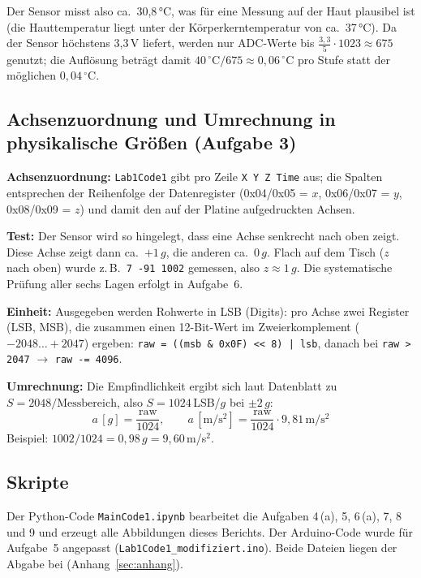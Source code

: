 \documentclass[a4paper,oneside,10pt]{article}
\begin{document}
Der Sensor misst also ca.\ 30{,}8\,°C, was für eine Messung auf der Haut plausibel
ist (die Hauttemperatur liegt unter der Körperkerntemperatur von ca.\ 37\,°C).
Da der Sensor höchstens 3{,}3\,V liefert, werden nur ADC-Werte bis
$\frac{3{,}3}{5}\cdot 1023 \approx 675$ genutzt; die Auflösung beträgt damit
$40\,^\circ\mathrm{C}/675 \approx 0{,}06\,^\circ$C pro Stufe statt der möglichen
$0{,}04\,^\circ$C.

\subsection{Achsenzuordnung und Umrechnung in physikalische Größen (Aufgabe 3)}

\textbf{Achsenzuordnung:} \texttt{Lab1Code1} gibt pro Zeile \texttt{X Y Z Time}
aus; die Spalten entsprechen der Reihenfolge der Datenregister (0x04/0x05 = $x$,
0x06/0x07 = $y$, 0x08/0x09 = $z$) und damit den auf der Platine aufgedruckten Achsen.

\textbf{Test:} Der Sensor wird so hingelegt, dass eine Achse senkrecht nach oben
zeigt. Diese Achse zeigt dann ca.\ $+1\,g$, die anderen ca.\ $0\,g$. Flach auf dem
Tisch ($z$ nach oben) wurde z.\,B.\ \texttt{7 -91 1002} gemessen, also $z \approx 1\,g$.
Die systematische Prüfung aller sechs Lagen erfolgt in Aufgabe~6.

\textbf{Einheit:} Ausgegeben werden Rohwerte in LSB (Digits): pro Achse zwei
Register (LSB, MSB), die zusammen einen 12-Bit-Wert im Zweierkomplement
($-2048 \ldots +2047$) ergeben:
\texttt{raw = ((msb \& 0x0F) << 8) | lsb}, danach bei \texttt{raw > 2047}
$\rightarrow$ \texttt{raw -= 4096}.

\textbf{Umrechnung:} Die Empfindlichkeit ergibt sich laut Datenblatt \cite{bma400}
 zu
$S = 2048/\text{Messbereich}$, also $S = 1024$\,LSB/$g$ bei $\pm 2\,g$:
\begin{equation}
  a\,[g] = \frac{\text{raw}}{1024}, \qquad
  a\,[\mathrm{m/s^2}] = \frac{\text{raw}}{1024}\cdot 9{,}81\,\mathrm{m/s^2}
\end{equation}
Beispiel: $1002/1024 = 0{,}98\,g = 9{,}60$\,m/s$^2$.

\subsection{Skripte}

Der Python-Code \texttt{MainCode1.ipynb} bearbeitet die Aufgaben 4\,(a), 5,
6\,(a), 7, 8 und 9 und erzeugt alle Abbildungen dieses Berichts. Der Arduino-Code
wurde für Aufgabe~5 angepasst (\texttt{Lab1Code1\_modifiziert.ino}). Beide Dateien
liegen der Abgabe bei (Anhang~\ref{sec:anhang}).
\end{document}
